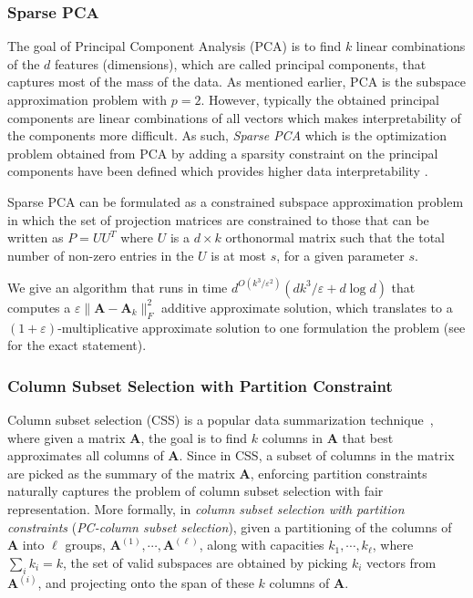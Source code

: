\documentclass[11pt]{article}
\theoremstyle{plain}
\theoremstyle{plain}
\theoremstyle{definition}
\theoremstyle{plain}
\theoremstyle{remark}
\DeclareRobustCommand{\fairCSSx}{PC-column subset selection}
\begin{document}
\subsubsection{Sparse PCA}
The goal of Principal Component Analysis (PCA) is to find $k$ linear combinations of the $d$ features (dimensions), which are called principal components, that captures most of the mass of the data. As mentioned earlier, PCA is the subspace approximation problem with $p=2$. However, typically the obtained principal components are linear combinations of all vectors which makes interpretability of the components more difficult. As such, {\em Sparse PCA} which is the optimization problem obtained from PCA by adding a sparsity
constraint on the principal components have been defined which provides higher data interpretability \cite{del2022sparse, zou2006sparse, cadima1995loading, hastie2015statistical, boutsidis2011sparse}.

Sparse PCA can be formulated as a constrained subspace approximation problem in which the set of projection matrices are constrained to those that can be written as $P=UU^T$ where $U$ is a $d\times k$ orthonormal matrix such that the total number of non-zero entries in the $U$ is at most $s$, for a given parameter $s$.

We give an algorithm that runs in time $d^{O(k^3/\varepsilon^2)}\left(dk^3/\varepsilon+ d\log d\right)$ that computes a $\varepsilon \|\bm{A}-\bm{A}_k\|_F^2$ additive approximate solution, which translates to a $(1+\varepsilon)$-multiplicative approximate solution to one formulation the problem (see  for the exact statement).

\subsubsection{Column Subset Selection with Partition Constraint}
Column subset selection (CSS) is a popular data summarization technique~\cite{boutsidis2014randomized,cohen2015dimensionality,altschuler2016greedy}, where given a matrix $\bm{A}$, the goal is to find $k$ columns in $\bm{A}$ that best approximates all columns of $\bm{A}$. Since in CSS, a subset of columns in the matrix are picked as the summary of the matrix $\bm{A}$, enforcing partition constraints naturally captures the problem of column subset selection with fair representation. 
More formally, in {\em column subset selection with partition constraints} ({\em\fairCSSx{}}), given a partitioning of the columns of $\bm{A}$ into $\ell$ groups, $\bm{A}^{(1)}, \cdots, \bm{A}^{(\ell)}$, along with capacities $k_1,\cdots,k_\ell$, where $\sum_i k_i=k$, the set of valid subspaces are obtained by picking $k_i$ vectors from $\bm{A}^{(i)}$, and projecting onto the span of these $k$ columns of $\bm{A}$.
\end{document}
